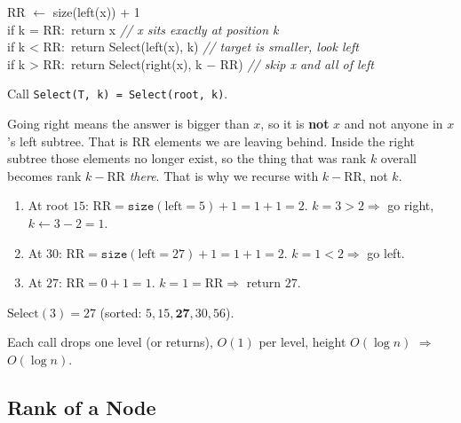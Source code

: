 \documentclass[11pt]{article}
\begin{document}
\begin{codebox}
\ttfamily RR $\leftarrow$ size(left(x)) + 1\\
\ttfamily if k = RR:\, return x \hfill\textnormal{\itshape // x sits exactly at position k}\\
\ttfamily if k < RR:\, return Select(left(x), k) \hfill\textnormal{\itshape // target is smaller, look left}\\
\ttfamily if k > RR:\, return Select(right(x), k $-$ RR) \hfill\textnormal{\itshape // skip x and all of left}
\end{codebox}

Call \texttt{Select(T, k) = Select(root, k)}.

\begin{keybox}
Going right means the answer is bigger than $x$, so it is \textbf{not} $x$ and not anyone in $x$'s left subtree. That is $\text{RR}$ elements we are leaving behind. Inside the right subtree those elements no longer exist, so the thing that was rank $k$ overall becomes rank $k - \text{RR}$ \emph{there}. That is why we recurse with $k - \text{RR}$, not $k$.
\end{keybox}

\begin{examplebox}[Trace: Select(3) on $S=\{5,15,27,30,56\}$]
\begin{enumerate}[leftmargin=1.4em,itemsep=1pt]
  \item At root $15$: $\text{RR}=\texttt{size}(\text{left}=5)+1 = 1+1 = 2$. \; $k=3 > 2 \Rightarrow$ go right, $k \leftarrow 3-2 = 1$.
  \item At $30$: $\text{RR}=\texttt{size}(\text{left}=27)+1 = 1+1 = 2$. \; $k=1 < 2 \Rightarrow$ go left.
  \item At $27$: $\text{RR}=0+1=1$. \; $k=1 = \text{RR} \Rightarrow$ \textcolor{greenO}{return $27$.}
\end{enumerate}
$\text{Select}(3)=27$ \checkmark (sorted: $5,15,\mathbf{27},30,56$).
\end{examplebox}

\begin{keybox}
Each call drops one level (or returns), $O(1)$ per level, height $O(\log n)$ $\Rightarrow$ \textcolor{violetT}{$O(\log n)$}.
\end{keybox}

\subsection{Rank of a Node}
\end{document}
